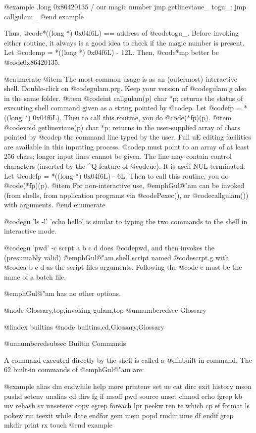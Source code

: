 {@example
        .long   0x86420135        / our magic number
        jmp     getlineviaue_
togu_:  jmp     callgulam_
@end example

Thus, @code{*((long *) 0x04f6L)} == address of @code{togu_}.  Before
invoking either routine, it always is a good idea to check if the magic
number is present.  Let @code{mp = *((long *) 0x04f6L) - 12L}.  Then,
@code{*mp} better be @code{0x86420135}.

@enumerate
@item
The most common usage is as an (outermost) interactive shell.
Double-click on @code{gulam.prg}.  Keep your version of @code{gulam.g} also
in the same folder.
@item
@code{int callgulam(p) char *p;} returns the status of executing
shell command given as a string pointed by @code{p}.  Let @code{fp =
*((long *) 0x04f6L)}.  Then to call this routine, you do @code{(*fp)(p)}.
@item
@code{void getlineviaue(p) char *p;} returns in the user-supplied
array of chars pointed by @code{p} the command line typed by the user.  Full
uE editing facilities are available in this inputting process.  @code{p} must
point to an array of at least 256 chars; longer input lines cannot be
given.  The line may contain control characters (inserted by the ^Q
feature of @code{ue}).  It is ascii NUL terminated.  Let @code{fp = *((long *)
0x04f6L) - 6L}.  Then to call this routine, you do @code{(*fp)(p)}.
@item
For non-interactive use, @emph{Gul@"am} can be invoked (from shells, from
application programs via @code{Pexec()}, or @code{callgulam()}) with arguments.
@end enumerate

@code{gu 'ls -l' 'echo hello'} is similar to typing the two commands to the
shell in interactive mode.

@code{gu 'pwd' -c scrpt a b c d} does @code{pwd}, and then invokes the
(presumably valid) @emph{Gul@"am} shell script named @code{scrpt.g} with
@code{a b c d} as the script files arguments.  Following the @code{-c}
must be the name of a batch file.

@emph{Gul@"am} has no other options.

@node Glossary,top,invoking-gulam,top
@unnumberedsec Glossary

@findex builtins
@node builtins,cd,Glossary,Glossary

@unnumberedsubsec Builtin Commands

A command executed directly by the shell is called a @dfn{built-in}
command.  The 62 built-in commands of @emph{Gul@"am} are:

@example
alias    dm       endwhile help     more     printenv set      ue 
cat      dirc     exit     history  mson     pushd    setenv   unalias 
cd       dirs     fg       if       msoff    pwd      source   unset 
chmod    echo     fgrep    kb       mv       rehash   sx       unsetenv 
copy     egrep    foreach  lpr      peekw    ren      te       which 
cp       ef       format   ls       pokew    rm       teexit   while 
date     endfor   gem      mem      popd     rmdir    time     
df       endif    grep     mkdir    print    rx       touch    
@end example

}
